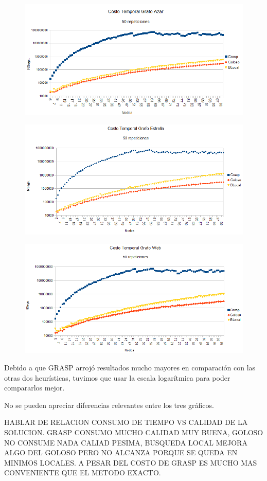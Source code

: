 \begin{figure}[H]
	\centering
	\includegraphics[scale=0.6]{timingAzar.png}
\end{figure}

\begin{figure}[H]
	\centering
	\includegraphics[scale=0.6]{timingStar.png}
\end{figure}

\begin{figure}[H]
	\centering
	\includegraphics[scale=0.6]{timingWeb.png}
\end{figure}

\quad

\quad Debido a que GRASP arrojó resultados mucho mayores en comparación con las otras dos heurísticas, tuvimos que usar la escala logarítmica para poder compararlos mejor.

\quad No se pueden apreciar diferencias relevantes entre los tres gráficos.

\quad HABLAR DE RELACION CONSUMO DE TIEMPO VS CALIDAD DE LA SOLUCION. GRASP CONSUMO MUCHO CALIDAD MUY BUENA, GOLOSO NO CONSUME NADA CALIAD PESIMA, BUSQUEDA LOCAL MEJORA ALGO DEL GOLOSO PERO NO ALCANZA PORQUE SE QUEDA EN MINIMOS LOCALES. A PESAR DEL COSTO DE GRASP ES MUCHO MAS CONVENIENTE QUE EL METODO EXACTO.

